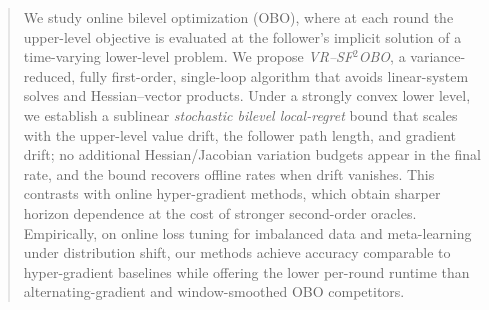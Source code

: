 \documentclass{uai2026} %
\begin{document}
\begin{abstract}
We study online bilevel optimization (OBO), where at each round the upper-level objective is evaluated at the follower’s implicit solution of a time-varying lower-level problem. We propose \emph{VR--SF$^2$OBO}, a variance-reduced, fully first-order, single-loop algorithm that avoids linear-system solves and Hessian--vector products. Under a strongly convex lower level, we establish a sublinear \emph{stochastic bilevel local-regret} bound that scales with the upper-level value drift, the follower path length, and gradient drift; no additional Hessian/Jacobian variation budgets appear in the final rate, and the bound recovers offline rates when drift vanishes. This contrasts with online hyper-gradient methods, which obtain sharper horizon dependence at the cost of stronger second-order oracles. Empirically, on online loss tuning for imbalanced data and meta-learning under distribution shift, our methods achieve accuracy comparable to hyper-gradient baselines while offering the lower per-round runtime than alternating-gradient and window-smoothed OBO competitors.

\end{abstract}
\end{document}
